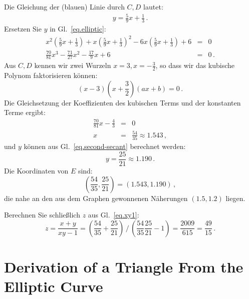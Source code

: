 Die Gleichung der (blauen) Linie durch $C,D$ lautet:
\begin{align}
y = \frac{5}{9}x + \frac{1}{3}\,.\label{eq.second-secant}
\end{align}
Ersetzen Sie $y$ in Gl.~\ref{eq.elliptic}:
\begin{eqnarray*}
x^2\left(\frac{5}{9}x + \frac{1}{3}\right) + x\left(\frac{5}{9}x + \frac{1}{3}\right)^2 -6x\left(\frac{5}{9}x + \frac{1}{3}\right) +6 &=&0\\
\frac{70}{81}x^3 - \frac{71}{27}x^2 - \frac{17}{9}x +6 &=&0\,.
\end{eqnarray*}
Aus $C,D$ kennen wir zwei Wurzeln $x=3,x=-\frac{3}{2}$, so dass wir das kubische Polynom faktorisieren können:
\[
(x-3)\left(x+\frac{3}{2}\right)(ax+b)=0\,.
\]
Die Gleichsetzung der Koeffizienten des kubischen Terms und der konstanten Terme ergibt:
\begin{eqnarray*}
\frac{70}{81}x - \frac{4}{3}&=&0\\
x&=& \frac{54}{35}\approx 1.543\,,
\end{eqnarray*}
und $y$ können aus Gl.~\ref{eq.second-secant} berechnet werden:
\[
y=\frac{25}{21}\approx 1.190\,.
\]
Die Koordinaten von $E$ sind:
\[
\left(\frac{54}{35}, \frac{25}{21}\right)=(1.543,1.190)\,,
\]
die nahe an den aus dem Graphen gewonnenen Näherungen $(1.5,1.2)$ liegen.

Berechnen Sie schließlich $z$ aus Gl.~\ref{eq.xy1}:
\[
z=\frac{x+y}{xy-1}=%
\displaystyle\left(\frac{54}{35} + \frac{25}{21}\right)%
 \, \bigg/ \,%
\displaystyle\left(\frac{54}{35}\frac{25}{21}-1\right)=%
\frac{2009}{615} = \frac{49}{15}\,.
\]

\section{Derivation of a Triangle From the Elliptic Curve}

\enlargethispage*{\baselineskip}


